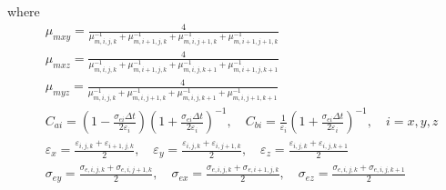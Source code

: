 \documentclass[pdftex,a4paper,parskip,listof=totoc,bibliography=totoc,onehalfspacing,12pt]{scrreprt}
\begin{document}
where
\begin{align*}
  &\mu_{mxy} = \frac{4}{\mu^{-1}_{m,i,j,k} + \mu^{-1}_{m,i+1,j,k} + \mu^{-1}_{m,i,j+1,k} + \mu^{-1}_{m,i+1,j+1,k}}\\
  &\mu_{mxz} = \frac{4}{\mu^{-1}_{m,i,j,k} + \mu^{-1}_{m,i+1,j,k} + \mu^{-1}_{m,i,j,k+1} + \mu^{-1}_{m,i+1,j,k+1}}\\
  &\mu_{myz} = \frac{4}{\mu^{-1}_{m,i,j,k} + \mu^{-1}_{m,i,j+1,k} + \mu^{-1}_{m,i,j,k+1} + \mu^{-1}_{m,i,j+1,k+1}}\\
  &C_{ai} = \left( 1 - \frac{\sigma_{ei} \Delta t}{2 \varepsilon_{i}} \right) \left( 1 + \frac{\sigma_{ei} \Delta t}{2 \varepsilon_{i}} \right)^{-1}, \quad
  C_{bi} = \frac{1}{\varepsilon_{i}} \left( 1 + \frac{\sigma_{ei} \Delta t}{2 \varepsilon_{i}} \right)^{-1}, \quad
  i = x,y,z\\
  &\varepsilon_{x} = \frac{\varepsilon_{i,j,k} + \varepsilon_{i+1,j,k}}{2}, \quad
  \varepsilon_{y} = \frac{\varepsilon_{i,j,k} + \varepsilon_{i,j+1,k}}{2}, \quad
  \varepsilon_{z} = \frac{\varepsilon_{i,j,k} + \varepsilon_{i,j,k+1}}{2} \\
  &\sigma_{ey} = \frac{\sigma_{e,i,j,k} + \sigma_{e,i,j+1,k}}{2}, \quad 
  \sigma_{ex} = \frac{\sigma_{e,i,j,k} + \sigma_{e,i+1,j,k}}{2}, \quad 
  \sigma_{ez} = \frac{\sigma_{e,i,j,k} + \sigma_{e,i,j,k+1}}{2} 
\end{align*}
\end{document}
